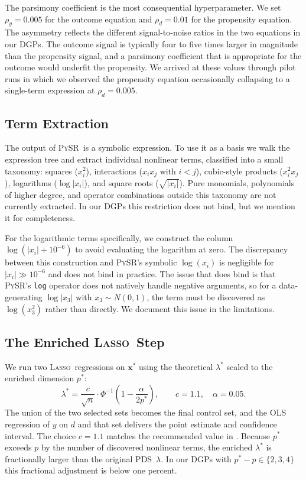 \documentclass[11pt, a4paper]{article}
\theoremstyle{plain}
\theoremstyle{definition}
\theoremstyle{remark}
\newcommand{\lasso}{\textsc{Lasso}}
\newcommand{\pds}{\textsc{PDS}}
\newcommand{\pysr}{\textsc{PySR}}
\newcommand{\Xstar}{\bm{x}^{*}}
\begin{document}
The parsimony coefficient is the most consequential
hyperparameter. We set $\rho_y = 0.005$ for the outcome equation
and $\rho_d = 0.01$ for the propensity equation. The asymmetry
reflects the different signal-to-noise ratios in the two
equations in our DGPs. The outcome signal is typically four to
five times larger in magnitude than the propensity signal, and a
parsimony coefficient that is appropriate for the outcome would
underfit the propensity. We arrived at these values through pilot
runs in which we observed the propensity equation occasionally
collapsing to a single-term expression at $\rho_d = 0.005$.

\subsection{Term Extraction}

The output of \pysr\ is a symbolic expression. To use it as a
basis we walk the expression tree and extract individual nonlinear
terms, classified into a small taxonomy: squares ($x_i^2$),
interactions ($x_i x_j$ with $i < j$), cubic-style products
($x_i^2 x_j$), logarithms ($\log|x_i|$), and square roots
($\sqrt{|x_i|}$). Pure monomials, polynomials of higher degree,
and operator combinations outside this taxonomy are not currently
extracted. In our DGPs this restriction does not bind, but we
mention it for completeness.

For the logarithmic terms specifically, we construct the column
$\log(|x_i| + 10^{-6})$ to avoid evaluating the logarithm at
zero. The discrepancy between this construction and \pysr's
symbolic $\log(x_i)$ is negligible for $|x_i| \gg 10^{-6}$ and
does not bind in practice. The issue that does bind is that
\pysr's \texttt{log} operator does not natively handle negative
arguments, so for a data-generating $\log|x_3|$ with $x_3 \sim
N(0, 1)$, the term must be discovered as $\log(x_3^2)$ rather
than directly. We document this issue in the limitations.

\subsection{The Enriched \lasso\ Step}

We run two \lasso\ regressions on $\Xstar$ using the theoretical
$\lambda^*$ scaled to the enriched dimension $p^*$:
\begin{equation}
    \lambda^* = \frac{c}{\sqrt{n}} \cdot
    \Phi^{-1}\!\left(1 - \frac{\alpha}{2 p^*}\right),
    \qquad c = 1.1, \quad \alpha = 0.05.
\end{equation}
The union of the two selected sets becomes the final control set,
and the OLS regression of $y$ on $d$ and that set delivers the
point estimate and confidence interval. The choice $c = 1.1$
matches the recommended value in \citet{bch2014}. Because $p^*$
exceeds $p$ by the number of discovered nonlinear terms, the
enriched $\lambda^*$ is fractionally larger than the original
\pds\ $\lambda$. In our DGPs with $p^* - p \in \{2, 3, 4\}$ this
fractional adjustment is below one percent.
\end{document}
